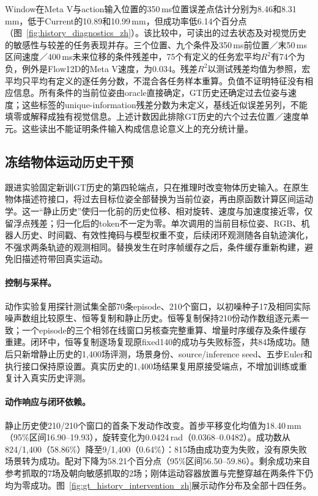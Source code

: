 Window在Meta V与action输入位置的350\,ms位置误差点估计分别为8.46和8.31\,mm，低于Current的10.89和10.99\,mm，但成功率低6.14个百分点（图~\ref{fig:history_diagnostics_zh}）。该比较中，可读出的过去状态及对视觉历史的敏感性与较差的任务表现并存。三个位置、九个条件及350\,ms前位置／末50\,ms区间速度／400\,ms未来位移的条件残差中，75个有定义的任务宏平均$R^2$有74个为负，例外是Flow12D的Meta V速度，为0.034。残差$R^2$以测试残差均值为参照，宏平均只平均有定义的逐任务分数，不混合各任务样本重算。负值不证明特征没有相应信息。所有条件的当前位姿由oracle直接确定，GT历史还确定过去位姿与速度；这些标签的unique-information残差分数为未定义，基线近似误差另列，不能填零或解释成独有视觉信息。上述计数因此排除GT历史的六个过去位置／速度单元。这些读出不能证明条件输入构成信息论意义上的充分统计量。

\subsection{冻结物体运动历史干预}
跟进实验固定新训GT历史的第四轮端点，只在推理时改变物体历史输入。在原生物体描述符接口，将过去目标位姿全部替换为当前位姿，再由原函数计算区间运动学。这一“静止历史”使归一化前的历史位移、相对旋转、速度与加速度接近零，仅留浮点残差；归一化后的token不一定为零。单次调用的当前目标位姿、RGB、机器人历史、时间戳、有效性掩码与模型权重不变，后续闭环观测随各自轨迹演化，不强求两条轨迹的观测相同。替换发生在时序帧缓存之后，条件缓存重新构建，避免旧描述符带回真实运动。

\paragraph{控制与采样。}
动作实验复用探针测试集全部70条episode、210个窗口，以初噪种子17及相同实际噪声数组比较原生、恒等复制和静止历史。恒等复制保持210份动作数组逐元素一致；一个episode的三个相邻在线窗口另核查完整重算、增量时序缓存及条件缓存重建。闭环中，恒等复制逐场复现原fixed140的成功与失败标签，共84场成功。随后只新增静止历史的1,400场评测，场景身份、source/inference seed、五步Euler和执行接口保持原设置。真实历史的1,400场结果复用原接受端点，不增加训练或重复计入真实历史评测。

\paragraph{动作响应与闭环依赖。}
静止历史使210/210个窗口的首条下发动作改变。首步平移变化均值为18.40\,mm（95\%区间16.90--19.93），旋转变化为0.0424\,rad（0.0368--0.0482）。成功数从824/1,400（58.86\%）降至9/1,400（0.64\%）：815场由成功变为失败，没有原失败场景转为成功。配对下降为58.21个百分点（95\%区间56.50--59.86）。剩余成功来自参考抓取的7场及朝向敏感抓取的2场；刚体运动容器放置与完整穿越在两条件下仍均为零成功。图~\ref{fig:gt_history_intervention_zh}展示动作分布及全部十四任务。

